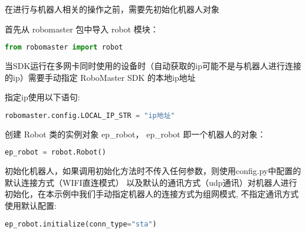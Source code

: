 

\begin{issues}
\issueDraft
\end{issues}

在进行与机器人相关的操作之前，需要先初始化机器人对象

首先从 robomaster 包中导入 robot 模块：

\begin{lstlisting}[language=python]
from robomaster import robot
\end{lstlisting}

当SDK运行在多网卡同时使用的设备时（自动获取的ip可能不是与机器人进行连接的ip）需要手动指定 RoboMaster SDK 的本地ip地址

指定ip使用以下语句:

\begin{lstlisting}[language=python]
robomaster.config.LOCAL_IP_STR = "ip地址"
\end{lstlisting}

创建 Robot 类的实例对象 ep_robot， ep_robot 即一个机器人的对象：

\begin{lstlisting}[language=python]
ep_robot = robot.Robot()
\end{lstlisting}

初始化机器人，如果调用初始化方法时不传入任何参数，则使用config.py中配置的默认连接方式（WIFI直连模式） 以及默认的通讯方式（udp通讯）对机器人进行初始化，在本示例中我们手动指定机器人的连接方式为组网模式, 不指定通讯方式使用默认配置:

\begin{lstlisting}[language=python]
ep_robot.initialize(conn_type="sta")
\end{lstlisting}
